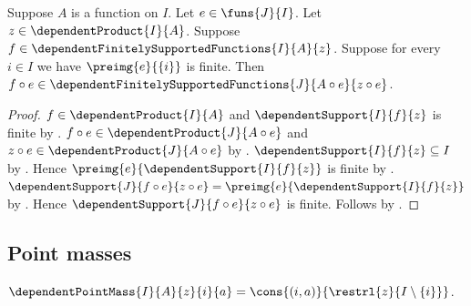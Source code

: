 \begin{theorem}\label{finite_support_precomposition}
    Suppose $A$ is a function on $I$.
    Let $e\in\funs{J}{I}$.
    Let $z\in\dependentProduct{I}{A}$.
    Suppose $f\in\dependentFinitelySupportedFunctions{I}{A}{z}$.
    Suppose for every $i\in I$ we have
        $\preimg{e}{\{i\}}$ is finite.
    Then
        $f\circ e\in
            \dependentFinitelySupportedFunctions
                {J}{A\circ e}{z\circ e}$.
\end{theorem}
\begin{proof}
    $f\in\dependentProduct{I}{A}$ and
        $\dependentSupport{I}{f}{z}$ is finite by
        .
    $f\circ e\in\dependentProduct{J}{A\circ e}$ and
        $z\circ e\in\dependentProduct{J}{A\circ e}$ by
        .
    $\dependentSupport{I}{f}{z}\subseteq I$ by
        .
    Hence $\preimg{e}{\dependentSupport{I}{f}{z}}$ is finite by
        .
    $\dependentSupport{J}{f\circ e}{z\circ e}
        =\preimg{e}{\dependentSupport{I}{f}{z}}$ by
        .
    Hence $\dependentSupport{J}{f\circ e}{z\circ e}$ is finite.
    Follows by
        .
\end{proof}

\subsection{Point masses}

\begin{definition}\label{dependent_point_mass}
    $\dependentPointMass{I}{A}{z}{i}{a}
        =\cons{(i,a)}{\restrl{z}{I\setminus\{i\}}}$.
\end{definition}

